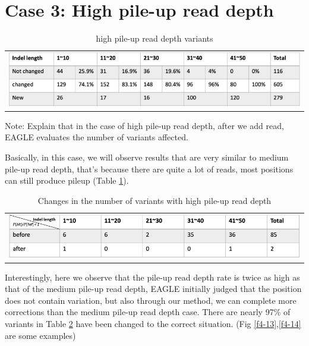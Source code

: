 \section{Case 3: High pile-up read depth}
\begin{table}[h]
    \centering
    \caption[high pile-up read depth variants]{high pile-up read depth variants}
     \vspace{-0.5cm}
    \begin{tabular}{c}
        \includegraphics[width=1\textwidth]{body/image/t4-6.png}
    \end{tabular}
    \label{t4-6}
    {Note: Explain that in the case of high pile-up read depth, after we add read, EAGLE evaluates the number of variants affected.}
\end{table}


Basically, in this case, we will observe results that are very similar to medium pile-up read depth, that's because there are quite a lot of reads, most positions can still produce pileup (Table \ref{t4-6}).

\vspace{1cm}
\begin{table}[h]
    \centering
    \caption[Changes in the number of variants with high pile-up read depth]{Changes in the number of variants with high pile-up read depth}
    \vspace{-0.5cm}
    \begin{tabular}{c}
        \includegraphics[width=1\textwidth]{body/image/t4-7.png}
    \end{tabular}
    \label{t4-7}
\end{table}

Interestingly, here we observe that the pile-up read depth rate is twice as high as that of the medium pile-up read depth, EAGLE initially judged that the position does not contain variation, but also through our method, we can complete more corrections than the medium pile-up read depth case. There are nearly 97\% of variants in Table \ref{t4-7} have been changed to the correct situation. (Fig \ref{f4-13},\ref{f4-14} are some examples)


